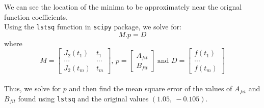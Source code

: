 \documentclass[11pt, a4paper]{article}
\begin{document}
            We can see the location of the minima to be approximately near the orignal function coefficients.\\

            Using the \texttt{lstsq} function in \texttt{scipy} package, we solve for:
            \begin{equation}
            M.p = D \label{eq5}
            \end{equation}
            where
            \begin{equation}
            M=\left[\begin{matrix}
            J_2(t_1)&t_1\\
            ...&...\\
            J_2(t_m)&t_m
            \end{matrix}\right]\text{, }p=\left[\begin{matrix}
            A_{fit}\\B_{fit}
            \end{matrix}\right]\ \text{and }D=\left[\begin{matrix}f(t_1)\\...\\f(t_m)\end{matrix}\right]
            \end{equation}\\

            Thus, we solve for $p$ and then find the mean square error of the values of $A_{fit}$ and $B_{fit}$ found using \texttt{lstsq} and the original values $(1.05,\ -0.105)$.
\end{document}
